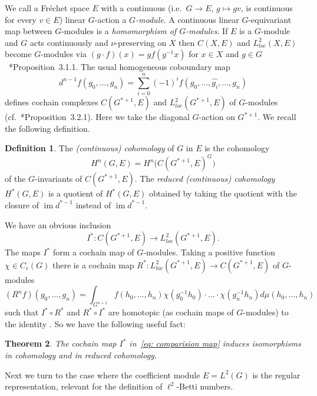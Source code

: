 \documentclass[10pt]{amsart}
\theoremstyle{plain}
\newtheorem{thm}{Theorem}
\theoremstyle{definition}
\newtheorem{defn}[thm]{Definition}
\theoremstyle{remark}
\begin{document}
We call a Fr\'{e}chet space $E$ with a continuous (i.e.~$G\to E$, $g\mapsto gv$,	 is continuous for every $v\in E$) linear $G$-action a \emph{$G$-module}.  A continuous linear $G$-equivariant map between $G$-modules is a \emph{homomorphism of $G$-modules}. 
If $E$ is a $G$-module and $G$ acts continuously and $\nu$-preserving on $X$ then $C(X, E)$ and 
${L^2_{loc}}(X, E)$ become $G$-modules via 
$(g\cdot f)(x)=gf(g^{-1}x)$ for $x\in X$ and $g\in G$~\cite{blanc}*{Proposition~3.1.1}. 
The usual homogeneous coboundary map
    \begin{equation}\label{eq: coboundary operator}
    d^{n-1} f(g_0,...,g_n)=\sum_{i=0}^n(-1)^i f(g_0,...,\widehat{g_i},...,g_n)
    \end{equation}
defines cochain complexes $C(G^{*+1},E)$ and ${L^2_{loc}}(G^{\ast +1},E)$ of $G$-modules (cf.~\cite{blanc}*{Proposition~3.2.1}). Here we take the diagonal $G$-action on $G^{\ast+1}$. We recall the following definition. 
\begin{defn}
The \emph{(continuous) cohomology} of $G$ in $E$ is the 
cohomology \[ H^n(G, E)=H^n\bigl( C(G^{*+1},E)^G\bigr)\]
of the $G$-invariants of $C(G^{*+1},E)$. The \emph{reduced (continuous) cohomology} $\underline{H}^*(G,E)$ is a quotient of $H^\ast(G,E)$ obtained by taking the quotient with the closure of ${\operatorname{im}} d^{\ast-1}$ instead of ${\operatorname{im}} d^{\ast-1}$.
\end{defn}

We have an obvious inclusion 
\begin{equation}\label{eq: comparision map}
 I^*:C(G^{*+1},E)\to L_{loc}^2(G^{*+1},E).
 \end{equation}
The maps $I^\ast$ form a cochain map of $G$-modules. Taking 
a positive function $\chi\in C_c(G)$ there is a cochain map $R^*:L_{loc}^2(G^{*+1},E)\to C(G^{*+1},E)$ of $G$-modules 
\[ (R^nf)(g_0,...,g_n)=\int_{G^{n+1}}f(h_0,...,h_n)\chi(g_0^{-1}h_0)\cdot ...\cdot\chi(g_n^{-1}h_n)d\mu(h_0,...,h_n) \]
such that $I^*\circ R^*$ and $R^*\circ I^*$ are homotopic (as cochain maps of $G$-modules) to the identity \cite[Proposition 4.8]{blanc}. 
So we have the following useful fact: 

\begin{thm}\label{thm: iso from continuous to loc}
The cochain map $I^\ast$ in~\eqref{eq: comparision map} induces 
isomorphisms in cohomology and in reduced cohomology. 
\end{thm}

Next we turn to the case where the coefficient module $E=L^2(G)$ is the 
regular representation, relevant for the definition of $\ell^2$-Betti numbers. 
\end{document}
